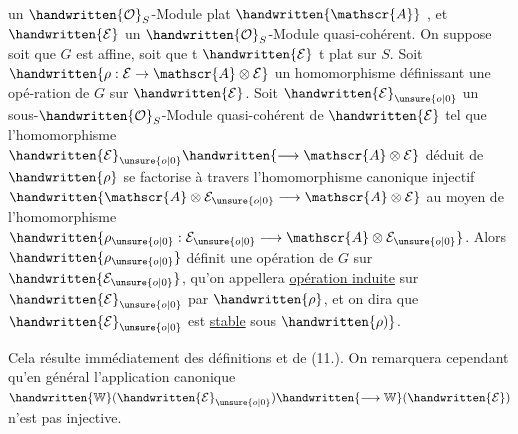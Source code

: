 un $\handwritten{\mathcal{O}}_S$-Module plat $\handwritten{\mathscr{A}}$ , et $\handwritten{\mathcal{E}}$ un $\handwritten{\mathcal{O}}_S$-Module quasi-cohérent. On suppose soit que $G$ est affine, soit que t $\handwritten{\mathcal{E}}$ t plat sur $S$. Soit $\handwritten{\rho:\mathcal{E}\to\mathscr{A}\otimes\mathcal{E}}$ un homomorphisme définissant une opé-\linebreak ration de $G$ sur $\handwritten{\mathcal{E}}$. Soit $\handwritten{\mathcal{E}}_{\unsure{o|0}}$ un sous-$\handwritten{\mathcal{O}}_S$-Module quasi-cohérent de $\handwritten{\mathcal{E}}$ tel que l'homomorphisme $\handwritten{\mathcal{E}}_{\unsure{o|0}}\handwritten{\longrightarrow\mathscr{A}\otimes\mathcal{E}}$ déduit de $\handwritten{\rho}$ se factorise à travers l'homomorphisme canonique \handwritten{(}injectif $\handwritten{\mathscr{A}\otimes\mathcal{E}_{\unsure{o|0}}\longrightarrow\mathscr{A}\otimes\mathcal{E}}$ au moyen de l'homomorphisme $\handwritten{\rho_{\unsure{o|0}}:\mathcal{E}_{\unsure{o|0}}\longrightarrow\mathscr{A}\otimes\mathcal{E}_{\unsure{o|0}}}$. Alors $\handwritten{\rho_{\unsure{o|0}}}$ définit une opération de $G$ sur $\handwritten{\mathcal{E}_{\unsure{o|0}}}$\handwritten{(},\handwritten{(} qu'on appellera \uline{opération induite} sur $\handwritten{\mathcal{E}}_{\unsure{o|0}}$ par $\handwritten{\rho}$, et on dira que $\handwritten{\mathcal{E}}_{\unsure{o|0}}$ est \uline{stable} sous $\handwritten{\rho)}$.

Cela résulte immédiatement des définitions et de (11.). On remarquera cependant qu'en général l'application canonique $\handwritten{\mathbb{W}}(\handwritten{\mathcal{E}}_{\unsure{o|0}})\handwritten{\longrightarrow\mathbb{W}}(\handwritten{\mathcal{E}})$ n'est pas injective.

